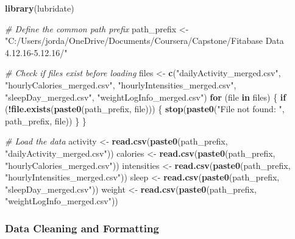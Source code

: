 \documentclass[
]{article}
\newenvironment{Shaded}{\begin{snugshade}}{\end{snugshade}}
\newcommand{\CommentTok}[1]{\textcolor[rgb]{0.56,0.35,0.01}{\textit{#1}}}
\newcommand{\ControlFlowTok}[1]{\textcolor[rgb]{0.13,0.29,0.53}{\textbf{#1}}}
\newcommand{\FunctionTok}[1]{\textcolor[rgb]{0.13,0.29,0.53}{\textbf{#1}}}
\newcommand{\NormalTok}[1]{#1}
\newcommand{\OtherTok}[1]{\textcolor[rgb]{0.56,0.35,0.01}{#1}}
\newcommand{\SpecialCharTok}[1]{\textcolor[rgb]{0.81,0.36,0.00}{\textbf{#1}}}
\newcommand{\StringTok}[1]{\textcolor[rgb]{0.31,0.60,0.02}{#1}}
\begin{document}
\begin{Shaded}
\begin{Highlighting}[]
\FunctionTok{library}\NormalTok{(lubridate)}

\CommentTok{\# Define the common path prefix}
\NormalTok{path\_prefix }\OtherTok{\textless{}{-}} \StringTok{"C:/Users/jorda/OneDrive/Documents/Coursera/Capstone/Fitabase Data 4.12.16{-}5.12.16/"}

\CommentTok{\# Check if files exist before loading}
\NormalTok{files }\OtherTok{\textless{}{-}} \FunctionTok{c}\NormalTok{(}\StringTok{"dailyActivity\_merged.csv"}\NormalTok{, }\StringTok{"hourlyCalories\_merged.csv"}\NormalTok{, }
           \StringTok{"hourlyIntensities\_merged.csv"}\NormalTok{, }\StringTok{"sleepDay\_merged.csv"}\NormalTok{, }
           \StringTok{"weightLogInfo\_merged.csv"}\NormalTok{)}
\ControlFlowTok{for}\NormalTok{ (file }\ControlFlowTok{in}\NormalTok{ files) \{}
  \ControlFlowTok{if}\NormalTok{ (}\SpecialCharTok{!}\FunctionTok{file.exists}\NormalTok{(}\FunctionTok{paste0}\NormalTok{(path\_prefix, file))) \{}
    \FunctionTok{stop}\NormalTok{(}\FunctionTok{paste0}\NormalTok{(}\StringTok{"File not found: "}\NormalTok{, path\_prefix, file))}
\NormalTok{  \}}
\NormalTok{\}}

\CommentTok{\# Load the data}
\NormalTok{activity }\OtherTok{\textless{}{-}} \FunctionTok{read.csv}\NormalTok{(}\FunctionTok{paste0}\NormalTok{(path\_prefix, }\StringTok{"dailyActivity\_merged.csv"}\NormalTok{))}
\NormalTok{calories }\OtherTok{\textless{}{-}} \FunctionTok{read.csv}\NormalTok{(}\FunctionTok{paste0}\NormalTok{(path\_prefix, }\StringTok{"hourlyCalories\_merged.csv"}\NormalTok{))}
\NormalTok{intensities }\OtherTok{\textless{}{-}} \FunctionTok{read.csv}\NormalTok{(}\FunctionTok{paste0}\NormalTok{(path\_prefix, }\StringTok{"hourlyIntensities\_merged.csv"}\NormalTok{))}
\NormalTok{sleep }\OtherTok{\textless{}{-}} \FunctionTok{read.csv}\NormalTok{(}\FunctionTok{paste0}\NormalTok{(path\_prefix, }\StringTok{"sleepDay\_merged.csv"}\NormalTok{))}
\NormalTok{weight }\OtherTok{\textless{}{-}} \FunctionTok{read.csv}\NormalTok{(}\FunctionTok{paste0}\NormalTok{(path\_prefix, }\StringTok{"weightLogInfo\_merged.csv"}\NormalTok{))}
\end{Highlighting}
\end{Shaded}

\hypertarget{data-cleaning-and-formatting}{%
\subsubsection{Data Cleaning and
Formatting}\label{data-cleaning-and-formatting}}
\end{document}
